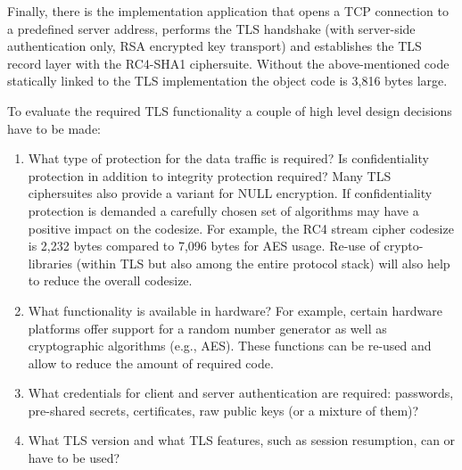 \documentclass[a4paper, 10pt]{IEEEtran}
\begin{document}
Finally, there is the implementation application that opens a TCP connection to a predefined server address, performs the TLS handshake (with server-side authentication only, RSA encrypted key transport) and establishes the TLS record layer with the RC4-SHA1 ciphersuite. Without the above-mentioned code statically linked to the TLS implementation the object code is 3,816 bytes large. 


To evaluate the required TLS functionality a couple of high level design decisions have 	to be made:

\begin{enumerate}
\item What type of protection for the data traffic is required? Is confidentiality protection in addition to integrity protection required? Many TLS ciphersuites also provide a variant for NULL encryption. If confidentiality protection is demanded a carefully chosen set of algorithms may have a positive impact on the codesize. For example, the RC4 stream cipher codesize is 2,232 bytes compared to 7,096 bytes for AES usage. Re-use of crypto-libraries (within TLS but also among the entire protocol stack) will also help to reduce the overall codesize. 
\item What functionality is available in hardware? For example, certain hardware platforms offer support for a random number generator as well as cryptographic algorithms (e.g., AES). These functions can be re-used and allow to reduce the amount of required code. 
\item What credentials for client and server authentication are required: passwords, pre-shared secrets, certificates, raw public keys (or a mixture of them)? 
\item What TLS version and what TLS features, such as session resumption, can or have to be used?
\end{enumerate} 
\end{document}
